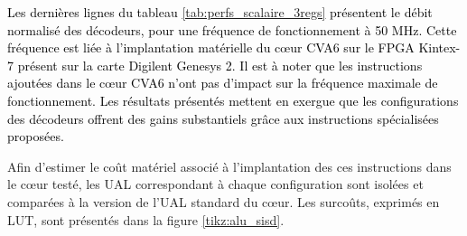 \documentclass[../main.tex]{subfiles}
\begin{document}
\textcolor{black}{Les dernières lignes du tableau \ref{tab:perfs_scalaire_3regs} présentent le débit normalisé des décodeurs, pour une fréquence de fonctionnement à 50 MHz. 
Cette fréquence est liée à l'implantation matérielle du cœur CVA6 sur le FPGA Kintex-7 présent sur la carte Digilent Genesys 2.
Il est à noter que les instructions ajoutées dans le cœur CVA6 n'ont pas d'impact sur la fréquence maximale de fonctionnement.
Les résultats présentés mettent en exergue que les configurations  des décodeurs offrent des gains substantiels grâce aux instructions spécialisées proposées.}

Afin d'estimer le coût matériel associé à l'implantation des ces instructions dans le cœur testé, les UAL correspondant à chaque configuration sont isolées et comparées à la version de l'UAL standard du cœur.
Les surcoûts, exprimés en LUT, sont présentés dans la figure \ref{tikz:alu_sisd}.
\end{document}
